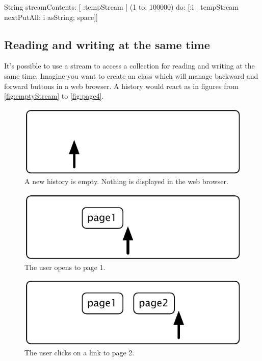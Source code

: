 \documentclass[a4paper,10pt,twoside]{book}
\begin{document}
{\begin{code}{}
String streamContents: [ :tempStream |
  (1 to: 100000)
       do: [:i | tempStream nextPutAll: i asString; space]] 
\end{code}

\subsection{Reading and writing at the same time}

It's possible to use a stream to access a collection for reading and
writing at the same time.
Imagine you want to create an  class which will manage
backward and forward buttons in a web browser.
A history would react as in figures from \ref{fig:emptyStream} to
\ref{fig:page4}.

\begin{figure}[!ht]
\centerline{\includegraphics[scale=0.5]{emptyStef}}
\caption{A new history is empty. Nothing is displayed in the web browser.}
\vspace{.2in}
\end{figure}

\begin{figure}[!ht]
\centerline{\includegraphics[scale=0.5]{page1Stef}}
\caption{The user opens to page 1.}
\vspace{.2in}
\end{figure}

\begin{figure}[!ht]
\centerline{\includegraphics[scale=0.5]{page2Stef}}
\caption{The user clicks on a link to page 2.}
\vspace{.2in}
\end{figure}

}
\end{document}
